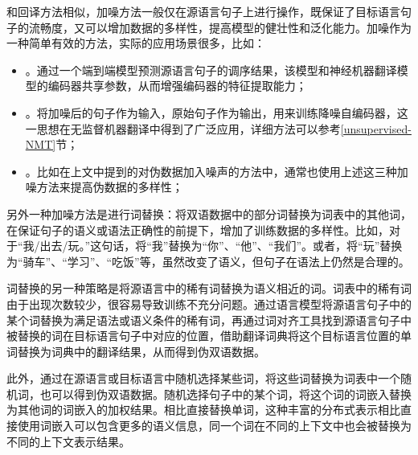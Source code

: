\parinterval 和回译方法相似，加噪方法一般仅在源语言句子上进行操作，既保证了目标语言句子的流畅度，又可以增加数据的多样性，提高模型的健壮性和泛化能力。加噪作为一种简单有效的方法，实际的应用场景很多，比如：
\begin{itemize}
    \vspace{0.5em}
    \item {\small{}}。通过一个端到端模型预测源语言句子的调序结果，该模型和神经机器翻译模型的编码器共享参数，从而增强编码器的特征提取能力；
    \vspace{0.5em}
    \item {\small{}}。将加噪后的句子作为输入，原始句子作为输出，用来训练降噪自编码器，这一思想在无监督机器翻译中得到了广泛应用，详细方法可以参考\ref{unsupervised-NMT}节；
    \vspace{0.5em}
    \item {\small{}}。比如在上文中提到的对伪数据加入噪声的方法中，通常也使用上述这三种加噪方法来提高伪数据的多样性；
    \vspace{0.5em}
\end{itemize}

\parinterval 另外一种加噪方法是进行词替换：将双语数据中的部分词替换为词表中的其他词，在保证句子的语义或语法正确性的前提下，增加了训练数据的多样性。比如，对于“我/出去/玩。”这句话，将“我”替换为“你”、“他”、“我们”。或者，将“玩”替换为“骑车”、“学习”、“吃饭”等，虽然改变了语义，但句子在语法上仍然是合理的。

\parinterval 词替换的另一种策略是将源语言中的稀有词替换为语义相近的词。词表中的稀有词由于出现次数较少，很容易导致训练不充分问题。通过语言模型将源语言句子中的某个词替换为满足语法或语义条件的稀有词，再通过词对齐工具找到源语言句子中被替换的词在目标语言句子中对应的位置，借助翻译词典将这个目标语言位置的单词替换为词典中的翻译结果，从而得到伪双语数据。

\parinterval 此外，通过在源语言或目标语言中随机选择某些词，将这些词替换为词表中一个随机词，也可以得到伪双语数据。随机选择句子中的某个词，将这个词的词嵌入替换为其他词的词嵌入的加权结果。相比直接替换单词，这种丰富的分布式表示相比直接使用词嵌入可以包含更多的语义信息，同一个词在不同的上下文中也会被替换为不同的上下文表示结果。

